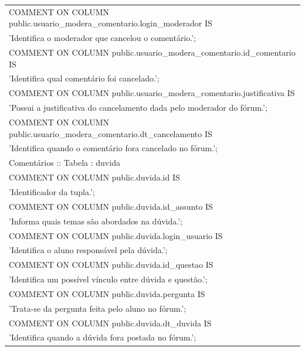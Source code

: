 \documentclass[graduacao,brazil]{ThesisPUC}
\begin{document}
\begin{table}[H]
{\begin{tabular}{|l|}
    COMMENT ON COLUMN public.usuario\_modera\_comentario.login\_moderador IS \\'Identifica o moderador que cancelou o comentário.'; \\COMMENT ON COLUMN public.usuario\_modera\_comentario.id\_comentario IS \\'Identifica qual comentário foi cancelado.'; \\COMMENT ON COLUMN public.usuario\_modera\_comentario.justificativa IS \\'Possui a justificativa do cancelamento dada pelo moderador do fórum.'; \\COMMENT ON COLUMN public.usuario\_modera\_comentario.dt\_cancelamento IS \\'Identifica quando o comentário fora cancelado no fórum.';                                                                                     \\ \hline
    Comentários :: Tabela : duvida                                                                                                                                                                                                                                                                                                                                                                                                                                                                                                                                                                                                        \\ \hline
    COMMENT ON COLUMN public.duvida.id IS \\'Identificador da tupla.'; \\COMMENT ON COLUMN public.duvida.id\_assunto IS \\'Informa quais temas são abordados na dúvida.'; \\COMMENT ON COLUMN public.duvida.login\_usuario IS \\'Identifica o aluno responsável pela dúvida.'; \\COMMENT ON COLUMN public.duvida.id\_questao IS \\'Identifica um possível vínculo entre dúvida e questão.'; \\COMMENT ON COLUMN public.duvida.pergunta IS \\'Trata-se da pergunta feita pelo aluno no fórum.'; \\COMMENT ON COLUMN public.duvida.dt\_duvida IS \\'Identifica quando a dúvida fora postada no fórum.';                                     \\ \hline

\end{tabular}}
\end{table}
\end{document}

